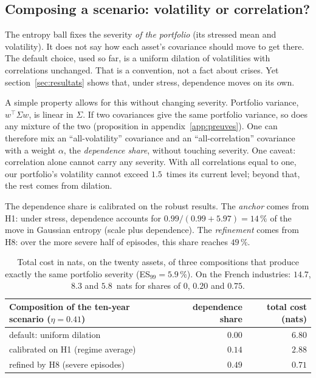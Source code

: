 \documentclass[11pt]{article}
\theoremstyle{definition}
\begin{document}
\subsection{Composing a scenario: volatility or correlation?}
\label{sec:composition}

The entropy ball fixes the severity \emph{of the portfolio} (its stressed mean
and volatility). It does not say how each asset's covariance should move to
get there. The default choice, used so far, is a uniform dilation of
volatilities with correlations unchanged. That is a convention, not a fact
about crises. Yet section~\ref{sec:resultats} shows that, under stress,
dependence moves on its own.

A simple property allows for this without changing severity. Portfolio
variance, $w^\top\Sigma w$, is linear in $\Sigma$. If two covariances give the
same portfolio variance, so does any mixture of the two (proposition in
appendix~\ref{app:preuves}). One can therefore mix an ``all-volatility''
covariance and an ``all-correlation'' covariance with a weight $\alpha$, the
\emph{dependence share}, without touching severity. One caveat: correlation
alone cannot carry any severity. With all correlations equal to one, our
portfolio's volatility cannot exceed $1.5$~times its current level; beyond
that, the rest comes from dilation.

The dependence share is calibrated on the robust results. The \emph{anchor}
comes from H1: under stress, dependence accounts for $0.99/(0.99+5.97)=14\,\%$
of the move in Gaussian entropy (scale plus dependence). The
\emph{refinement} comes from H8: over the more severe half of episodes, this
share reaches $49\,\%$.

\begin{table}[htbp]
\centering
\small
\begin{tabular}{@{}lrr@{}}
\toprule
Composition of the ten-year scenario ($\eta=0.41$) & dependence share & total cost (nats) \\
\midrule
default: uniform dilation & $0.00$ & $6.80$ \\
calibrated on H1 (regime average) & $0.14$ & $2.88$ \\
refined by H8 (severe episodes) & $0.49$ & $0.71$ \\
\bottomrule
\end{tabular}
\caption{Total cost in nats, on the twenty assets, of three compositions that
produce exactly the same portfolio severity (ES$_{99}=5.9\,\%$). On the French
industries: $14.7$, $8.3$ and $5.8$~nats for shares of $0$, $0.20$ and
$0.75$.}
\label{tab:composition}
\end{table}
\end{document}
